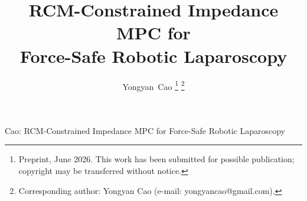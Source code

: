 \documentclass[journal]{IEEEtran}
\begin{document}
\title{RCM-Constrained Impedance MPC for\\Force-Safe Robotic Laparoscopy}

\author{Yongyan~Cao%
\thanks{Preprint, June 2026. This work has been submitted for possible publication; copyright may be transferred without notice.}%
\thanks{Corresponding author: Yongyan Cao (e-mail: yongyancao@gmail.com).}%
}

%
{Cao: RCM-Constrained Impedance MPC for Force-Safe Robotic Laparoscopy}

\maketitle



\balance
\end{document}
